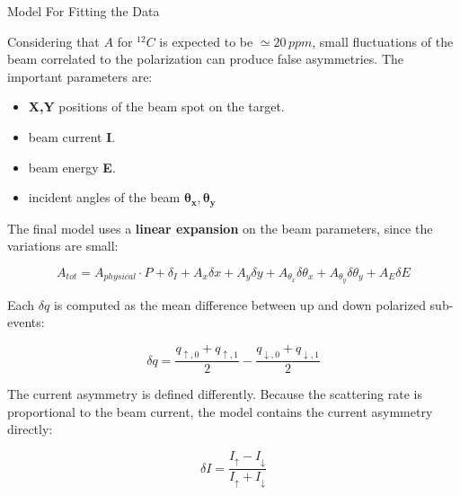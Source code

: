 \documentclass[9pt,a4paper]{beamer}
\begin{document}
\begin{frame}[t]{Model For Fitting the Data}

Considering that $A$ for $^{12}C$ is expected to be $\simeq 20 \, ppm$, small fluctuations of the beam correlated to the polarization can produce false asymmetries. The important parameters are:

\begin{itemize}
\item \textbf{X,Y} positions of the beam spot on the target.
\item beam current \textbf{I}.
\item beam energy \textbf{E}.
\item incident angles of the beam {$\bm{\theta_{x}},\bm{\theta_{y}}$}
\end{itemize}

The final model uses a \textbf{linear expansion} on the beam parameters, since the variations are small:

\begin{equation}
A_{tot} = A_{physical} \cdot P + \delta_{I} + A_{x} \delta x + A_{y} \delta y + A_{\theta_{x}} \delta \theta_{x} + A_{\theta_{y}} \delta \theta_{y}+ A_{E} \delta E 
\end{equation}

Each $\delta q$ is computed as the mean difference between up and down polarized sub-events:

\begin{equation}
\delta q = \dfrac{q_{\uparrow,0} + q_{\uparrow,1}}{2} - \dfrac{q_{\downarrow,0} + q_{\downarrow,1}}{2}
\end{equation}

The current asymmetry is defined differently. Because the scattering rate is proportional to the beam current, the model contains the current asymmetry directly:

\begin{equation}
\delta I = \dfrac{I_{\uparrow} - I_{\downarrow}}{I_{\uparrow} + I_{\downarrow}}
\end{equation}

\end{frame}
\end{document}
